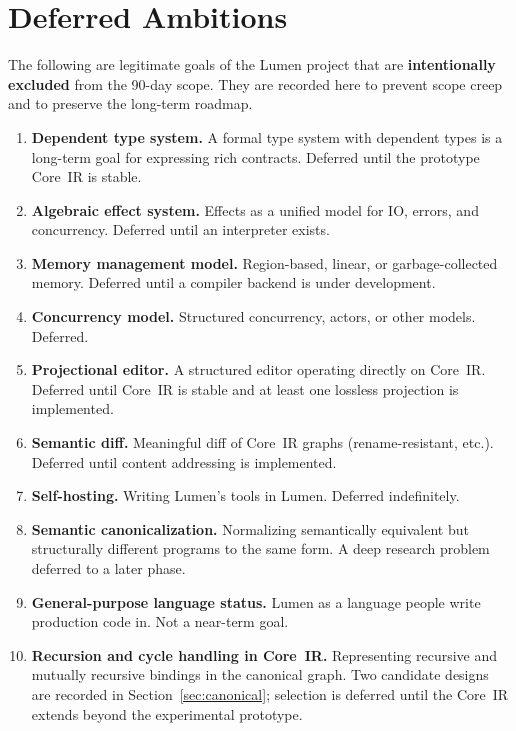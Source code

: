 \documentclass[11pt]{article}
\begin{document}
\section{Deferred Ambitions}
\label{sec:deferred}

The following are legitimate goals of the Lumen project that are
\textbf{intentionally excluded} from the 90-day scope.  They are
recorded here to prevent scope creep and to preserve the long-term
roadmap.

\begin{enumerate}
  \item \textbf{Dependent type system.}
        A formal type system with dependent types is a long-term goal
        for expressing rich contracts.  Deferred until the prototype
        Core~IR is stable.

  \item \textbf{Algebraic effect system.}
        Effects as a unified model for IO, errors, and concurrency.
        Deferred until an interpreter exists.

  \item \textbf{Memory management model.}
        Region-based, linear, or garbage-collected memory.  Deferred
        until a compiler backend is under development.

  \item \textbf{Concurrency model.}
        Structured concurrency, actors, or other models.  Deferred.

  \item \textbf{Projectional editor.}
        A structured editor operating directly on Core~IR.  Deferred
        until Core~IR is stable and at least one lossless projection
        is implemented.

  \item \textbf{Semantic diff.}
        Meaningful diff of Core~IR graphs (rename-resistant, etc.).
        Deferred until content addressing is implemented.

  \item \textbf{Self-hosting.}
        Writing Lumen's tools in Lumen.  Deferred indefinitely.

  \item \textbf{Semantic canonicalization.}
        Normalizing semantically equivalent but structurally different
        programs to the same form.  A deep research problem deferred
        to a later phase.

  \item \textbf{General-purpose language status.}
        Lumen as a language people write production code in.  Not a
        near-term goal.

  \item \textbf{Recursion and cycle handling in Core~IR.}
        Representing recursive and mutually recursive bindings in the
        canonical graph.  Two candidate designs are recorded in
        Section~\ref{sec:canonical}; selection is deferred until the
        Core~IR extends beyond the experimental prototype.
\end{enumerate}
\end{document}
